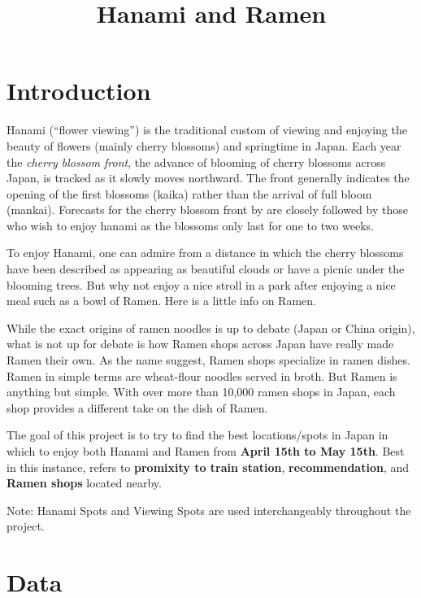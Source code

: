 \documentclass[11pt]{article}
\title{Hanami and Ramen}
\date{}
\begin{document}
    
\maketitle

    \hypertarget{introduction}{%
\section{Introduction}\label{introduction}}

    Hanami (``flower viewing'') is the traditional custom of viewing and
enjoying the beauty of flowers (mainly cherry blossoms) and springtime
in Japan. Each year the \emph{cherry blossom front}, the advance of
blooming of cherry blossoms across Japan, is tracked as it slowly moves
northward. The front generally indicates the opening of the first
blossoms (kaika) rather than the arrival of full bloom (mankai).
Forecasts for the cherry blossom front by are closely followed by those
who wish to enjoy hanami as the blossoms only last for one to two weeks.

To enjoy Hanami, one can admire from a distance in which the cherry
blossoms have been described as appearing as beautiful clouds or have a
picnic under the blooming trees. But why not enjoy a nice stroll in a park after
enjoying a nice meal such as a bowl of Ramen. Here is a little info on Ramen.

While the exact origins of ramen noodles is up to debate (Japan or China
origin), what is not up for debate is how Ramen shops across Japan have
really made Ramen their own. As the name suggest, Ramen shops specialize
in ramen dishes. Ramen in simple terms are wheat-flour noodles served in
broth. But Ramen is anything but simple. With over more than 10,000
ramen shops in Japan, each shop provides a different take on the dish of
Ramen.

The goal of this project is to try to find the best locations/spots in Japan in
which to enjoy both Hanami and Ramen from \textbf{April 15th to May
15th}. Best in this instance, refers to \textbf{promixity to train station}, 
\textbf{recommendation}, and \textbf{Ramen shops} located nearby.

Note: Hanami Spots and Viewing Spots are used interchangeably throughout
the project.

\hypertarget{data}{%
\section{Data}\label{data}}
\end{document}
